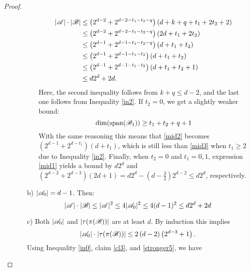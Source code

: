 \begin{proof}
\begin{enumerate}
\begin{enumerate}
\begin{enumerate}
                \begin{align}
                    \left|{\mathscr{A}}\right|\cdot\left|{\mathscr{B}}\right| 
                    & \leq \left(2^{d-2} + 2^{d-2-t_1-t_2-q}\right)\left(d+k+q+t_1+2t_2+2\right) \nonumber \\ 
                    & \leq \left(2^{d-2} + 2^{d-2-t_1-t_2-q}\right)\left(2d+t_1+2t_2\right) \label{mid1} \\
                    & \leq \left(2^{d-1} + 2^{d-1-t_1-t_2-q}\right)\left(d+t_1+t_2\right) \nonumber \\
                    & \leq \left(2^{d-1} + 2^{d-1-t_1-t_2}\right)\left(d+t_1+t_2\right) \label{mid2} \\
                    & \leq \left(2^{d-1} + 2^{d-1-t_1-t_2}\right)\left(d+t_1+t_2+1\right) \nonumber \\
                    & \leq d2^d + 2d. \label{mid3}             
                \end{align}
                Here, the second inequality follows from $k+q\leq d-2$, and the last one follows from Inequality \ref{in2}. If $t_2=0$, we get a slightly weaker bound:
                \begin{equation*}
                    \operatorname{dim}(\operatorname{span}({\mathscr{B}}_1)) \geq t_1+t_2+q+1
                \end{equation*}
                With the same reasoning this means that \eqref{mid2} becomes $\left(2^{d-1} + 2^{d-t_1}\right)\left(d+t_1\right)$, which is still less than \eqref{mid3} when $t_1\geq2$ due to Inequality \ref{in2}. Finally, when $t_2=0$ and $t_1=0, 1$, expression \eqref{mid1} yields a bound by $d2^d$ and $(2^{d-2}+2^{d-3})(2d+1)=d 2^d - \left(d-\frac{3}{2}\right)2^{d-2}\leq d2^d$, respectively.
            \end{enumerate}
            \item[b)] $|{\mathscr{A}}_0|=d-1$. Then:
            \begin{equation*}
                |{\mathscr{A}}|\cdot|{\mathscr{B}}|\leq|{\mathscr{A}}|^2\leq4|{\mathscr{A}}_0|^2\leq4(d-1)^2\leq d2^d+2d 
            \end{equation*}
            \item[c)] Both $|{\mathscr{A}}_0|$ and $|\tau(\pi({\mathscr{B}}))|$ are at least $d$. By induction this implies 
            \[
            \left|{\mathscr{A}}_0\right|\cdot\left|\tau(\pi({\mathscr{B}}))\right|\leq2\left(d-2\right)\left(2^{d-3}+1\right).
            \]
            Using Inequality \ref{in0}, claim \ref{cl3}, and \eqref{stronger5}, we have 
            \begin{equation*}

\end{equation*}
\end{enumerate}
\end{enumerate}
\end{proof}
